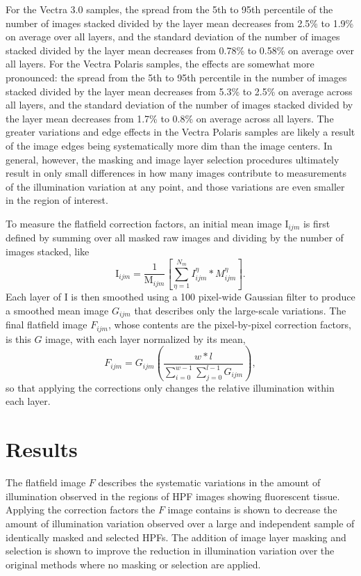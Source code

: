 \documentclass[letterpaper,11pt]{article}
\newcommand{\Iota}{\mathrm{I}}
\newcommand{\Mu}{\mathrm{M}}
\begin{document}
For the Vectra 3.0 samples, the spread from the 5th to 95th percentile of the number of images stacked divided by the layer mean decreases from 2.5\% to 1.9\% on average over all layers, and the standard deviation of the number of images stacked divided by the layer mean decreases from 0.78\% to 0.58\% on average over all layers. For the Vectra Polaris samples, the effects are somewhat more pronounced: the spread from the 5th to 95th percentile in the number of images stacked divided by the layer mean decreases from 5.3\% to 2.5\% on average across all layers, and the standard deviation of the number of images stacked divided by the layer mean decreases from 1.7\% to 0.8\% on average across all layers. The greater variations and edge effects in the Vectra Polaris samples are likely a result of the image edges being systematically more dim than the image centers. In general, however, the masking and image layer selection procedures ultimately result in only small differences in how many images contribute to measurements of the illumination variation at any point, and those variations are even smaller in the region of interest.

To measure the flatfield correction factors, an initial mean image $\Iota_{ijm}$ is first defined by summing over all masked raw images and dividing by the number of images stacked, like
\begin{equation}
\Iota_{ijm} = \frac{1}{\Mu_{ijm}} \left[ \sum_{\eta=1}^{N_{m}} I^{\eta}_{ijm}*M^{\eta}_{ijm} \right] .
\end{equation}
Each layer of $\Iota$ is then smoothed using a 100 pixel-wide Gaussian filter to produce a smoothed mean image $G_{ijm}$ that describes only the large-scale variations. The final flatfield image $F_{ijm}$, whose contents are the pixel-by-pixel correction factors, is this $G$ image, with each layer normalized by its mean,
\begin{equation}
F_{ijm} = G_{ijm} \left( \frac{w*l}{\sum_{i=0}^{w-1}\sum_{j=0}^{l-1}G_{ijm}} \right) ,
\end{equation}
so that applying the corrections only changes the relative illumination within each layer. 

\section{Results}
\label{sec:results}

The flatfield image $F$ describes the systematic variations in the amount of illumination observed in the regions of HPF images showing fluorescent tissue. Applying the correction factors the $F$ image contains is shown to decrease the amount of illumination variation observed over a large and independent sample of identically masked and selected HPFs. The addition of image layer masking and selection is shown to improve the reduction in illumination variation over the original methods where no masking or selection are applied.
\end{document}
